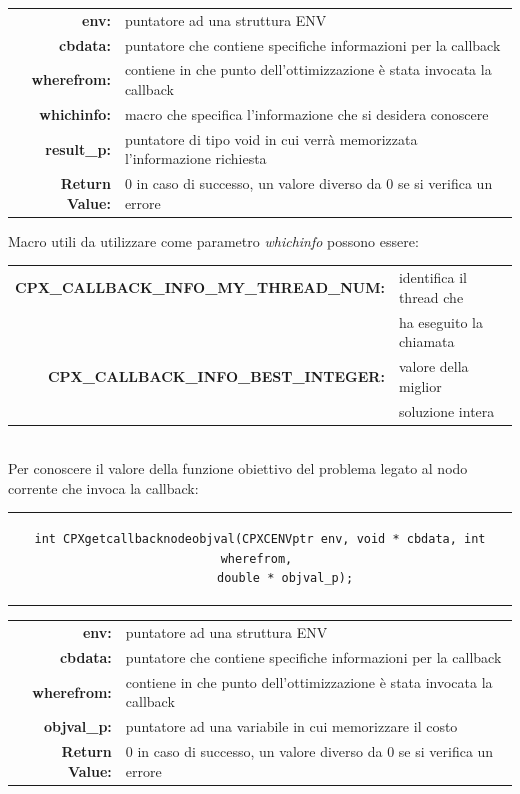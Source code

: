 \begin{table}[h]
\centering
\begin{tabular}{rl}
\textbf{env:} & {puntatore ad una struttura ENV}\\
\textbf{cbdata:} & {puntatore che contiene specifiche informazioni per la callback}\\
\textbf{wherefrom:} & {contiene in che punto dell'ottimizzazione è stata invocata la callback}\\ 
\textbf{whichinfo:} & {macro che specifica l'informazione che si desidera conoscere} \\
\textbf{result\_p:} & {puntatore di tipo void in cui verrà memorizzata l'informazione richiesta}\\ 
\textbf{Return Value:} & {0 in caso di successo, un valore diverso da 0 se si verifica un errore}\\          
\end{tabular}
\end{table}
Macro utili da utilizzare come parametro \textit{whichinfo} possono essere:
\begin{table}[h]
\centering \footnotesize
\begin{tabular}{|r|l|}
\hline
\textbf{CPX\_CALLBACK\_INFO\_MY\_THREAD\_NUM:} & {identifica il thread che }\\
&{ha eseguito la chiamata}\\
\hline
\textbf{CPX\_CALLBACK\_INFO\_BEST\_INTEGER:} & {valore della miglior}\\
&{soluzione intera}\\
\hline
\end{tabular}
\end{table}
\\Per conoscere il valore della funzione obiettivo del problema legato al nodo corrente che invoca la callback:
\begin{center}
\begin{tabular}{c}
\begin{lstlisting}[linewidth=380pt, basicstyle=\footnotesize\sffamily,] 
int CPXgetcallbacknodeobjval(CPXCENVptr env, void * cbdata, int wherefrom, 
		double * objval_p); 
\end{lstlisting}
\end{tabular}
\end{center}
\begin{table}[H]
\centering
\begin{tabular}{rl}
\textbf{env:} & {puntatore ad una struttura ENV}\\
\textbf{cbdata:} & {puntatore che contiene specifiche informazioni per la callback}\\
\textbf{wherefrom:} & {contiene in che punto dell'ottimizzazione è stata invocata la callback} \\ 
\textbf{objval\_p:} & {puntatore ad una variabile in cui memorizzare il costo} \\
\textbf{Return Value:} & {0 in caso di successo, un valore diverso da 0 se si verifica un errore}\\  
\end{tabular}
\end{table}

